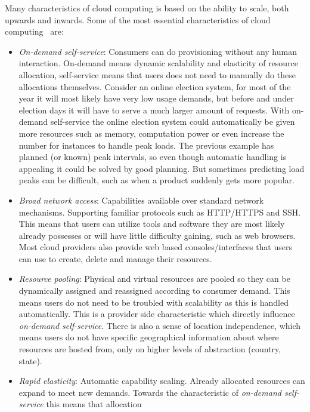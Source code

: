 Many characteristics of cloud computing is based on the ability to scale, both upwards and inwards.
Some of the most essential characteristics of cloud computing~\cite{nist:mell11} are:
\begin{itemize}
  \item \emph{On-demand self-service}: 
    Consumers can do provisioning without any human interaction.
    On-demand means dynamic scalability and elasticity of resource allocation,
    self-service means that users does not need to manually do these allocations themselves.
    Consider an online election system, for most of the year it will most likely have very
    low usage demands, but before and under election days it will have to serve
    a much larger amount of requests. With on-demand self-service the online election system
    could automatically be given more resources such as memory, computation power or even
    increase the number for instances to handle peak loads.
    The previous example has planned (or known) peak intervals, so even though automatic handling
    is appealing it could be solved by good planning. 
    But sometimes predicting load peaks can be difficult, such as when a product suddenly
    gets more popular.
  \item \emph{Broad network access}: Capabilities available over standard network mechanisms.
    Supporting familiar protocols such as HTTP/HTTPS and SSH.
    This means that users can utilize tools and software they are most likely already possesses
    or will have little difficulty gaining, such as web browsers.
    Most cloud providers also provide web based consoles/interfaces that users can use
    to create, delete and manage their resources.
  \item \emph{Resource pooling}: Physical and virtual resources are pooled so they can be 
    dynamically assigned and reassigned according to consumer demand.
    This means users do not need to be troubled with scalability as this is handled automatically.
    This is a provider side characteristic which directly influence \emph{on-demand self-service}.
    There is also a sense of location independence, which means users do not have specific geographical
    information about where resources are hosted from, only on higher levels of abstraction (country, state).
  \item \emph{Rapid elasticity}: Automatic capability scaling.
    Already allocated resources can expand to meet new demands.
    Towards the characteristic of \emph{on-demand self-service} this means that allocation

\end{itemize}
